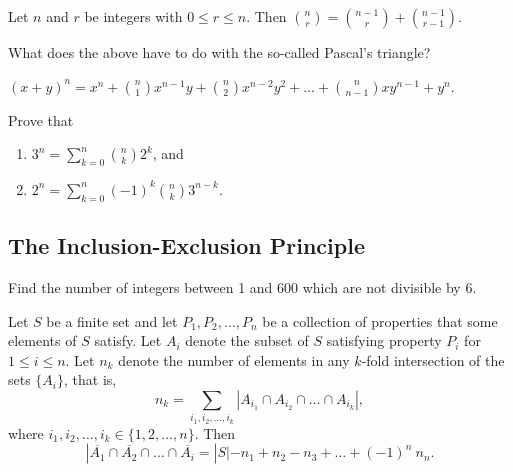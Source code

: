 \begin{theorem} Let $n$ and $r$ be integers with $0\leq r \leq n$.  Then ${{n}\choose{r}} = {{n-1}\choose{r}} + {{n-1}\choose{r-1}}$.
\end{theorem}

\begin{exercise} What does the above have to do with the so-called Pascal's triangle?
\end{exercise}

\begin{theorem} $(x+y)^n = x^n + {{n}\choose{1}} x^{n-1} y + {{n}\choose{2}} x^{n-2}y^2 + \ldots + {{n}\choose{n-1}} x y^{n-1} + y^n$.
\end{theorem}

\begin{exercise} Prove that
    \begin{enumerate}
        \item $\displaystyle 3^n = \sum_{k=0}^n {{n}\choose{k}} 2^k$, and
        \item $\displaystyle 2^n = \sum_{k=0}^n (-1)^k {{n}\choose{k}} 3^{n-k}$.
    \end{enumerate}
\end{exercise}

\subsection{The Inclusion-Exclusion Principle}

\begin{exercise} Find the number of integers between 1 and 600 which are not divisible by 6.
\end{exercise}

\begin{theorem} Let $S$ be a finite set and let $P_1, P_2, \ldots, P_n$ be a collection of properties that some elements of $S$ satisfy.  Let $A_i$ denote the subset of $S$ satisfying property $P_i$ for $1\leq i \leq n$.  Let $n_k$ denote the number of elements in any $k$-fold intersection of the sets $\{A_i\}$, that is,
$$n_k = \displaystyle \sum_{i_1, i_2, \ldots, i_k} |A_{i_1} \cap A_{i_2} \cap \ldots \cap A_{i_k}|,$$
where $i_1, i_2, \ldots, i_k \in \{1, 2, \ldots, n\}$.  Then
$$|\overline{A_1}\cap \overline{A_2}\cap \ldots \cap \overline{A_i} = |S| - n_1 + n_2 - n_3 + \ldots + (-1)^n\ n_n.$$
\end{theorem}

